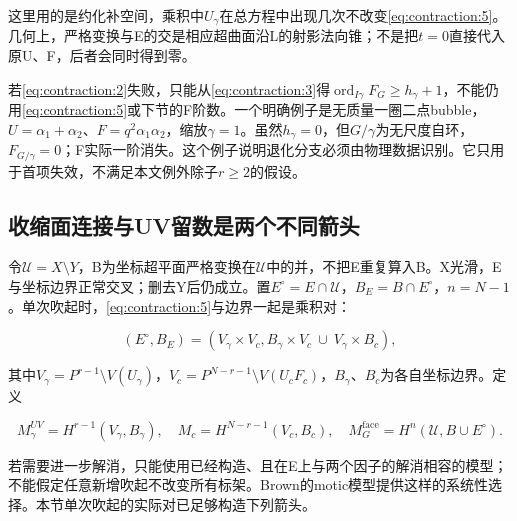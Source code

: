 \documentclass[11pt,a4paper,oneside]{ctexart}
\theoremstyle{cnplain}
\theoremstyle{definition}
\theoremstyle{remark}
\numberwithin{equation}{section}
\begin{document}
这里用的是约化补空间，乘积中\(U_\gamma \)在总方程中出现几次不改变\eqref{eq:contraction:5}。几何上，严格变换与E的交是相应超曲面沿L的射影法向锥；不是把\(t=0\)直接代入原U、F，后者会同时得到零。

若\eqref{eq:contraction:2}失败，只能从\eqref{eq:contraction:3}得\(\operatorname{ord}_{I\gamma }F_G\ge h_\gamma +1\)，不能仍用\eqref{eq:contraction:5}或下节的F阶数。一个明确例子是无质量一圈二点bubble，\(U=\alpha _1+\alpha _2\)、\(F=q^{2}\alpha _1\alpha _2\)，缩放\(\gamma ={1}\)。虽然\(h_\gamma =0\)，但\(G/\gamma \)为无尺度自环，\(F_{G/\gamma }=0\)；F实际一阶消失。这个例子说明退化分支必须由物理数据识别。它只用于首项失效，不满足本文例外除子\(r\ge 2\)的假设。


\subsection{收缩面连接与UV留数是两个不同箭头}\label{sec:contraction:3}

令\(\mathcal U=X\setminus Y\)，B为坐标超平面严格变换在\(\mathcal U\)中的并，不把E重复算入B。X光滑，E与坐标边界正常交叉；删去Y后仍成立。置\(E^\circ=E\cap \)\(\mathcal U\)，\(B_E=B\cap E^\circ\)，\(n=N- 1\)。单次吹起时，\eqref{eq:contraction:5}与边界一起是乘积对：

\begin{equation}
(E^\circ,B_E)=(V_\gamma\times V_c,
                    B_\gamma\times V_c\ \cup\ V_\gamma\times B_c),            \label{eq:contraction:6}
\end{equation}

其中\(V_\gamma =P^{r- 1}\setminus V(U_\gamma )\)，\(V_c=P^{N- r- 1}\setminus V(U_c F_c)\)，\(B_\gamma \)、\(B_c\)为各自坐标边界。定义

\begin{equation}
M_\gamma^{UV}=H^{r-1}(V_\gamma,B_\gamma),\quad
 M_c=H^{N-r-1}(V_c,B_c),\quad
 M_G^{\mathrm{face}}=H^n(\mathcal U,B\cup E^\circ).                \label{eq:contraction:7}
\end{equation}

若需要进一步解消，只能使用已经构造、且在E上与两个因子的解消相容的模型；不能假定任意新增吹起不改变所有标架。Brown的motic模型提供这样的系统性选择\cite{browncosmic}。本节单次吹起的实际对已足够构造下列箭头。
\end{document}
